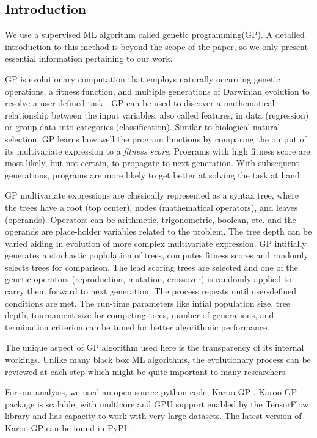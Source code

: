 \subsection{Introduction}
We use a supervised ML algorithm called genetic programming(GP)\cite{koza_genetic}. A detailed introduction to this method is beyond the scope of the paper, so we only present essential information pertaining to our work.

GP is evolutionary computation that employs naturally occurring genetic operations, a fitness function, and multiple generations of
Darwinian evolution to resolve a user-defined task \cite{GP_book}. GP can be used to discover a mathematical relationship between the input variables, also called features, in data (regression) or group data into categories (classification). Similar to biological natural selection, GP learns how well the program functions by comparing the output of its multivariate expression to a \emph{fitness score}. Programs with high fitness score are most likely, but not certain, to propagate to next generation. With subsequent generations, programs are more likely to get better at solving the task at hand \cite{Kai_thesis}. 

GP multivariate expressions are classically represented as a syntax tree, where the trees have a root (top center), nodes (mathematical operators), and leaves (operands). Operators can be arithmetic, trigonometric, boolean, etc. and the operands are place-holder variables related to the problem. The tree depth can be varied aiding in evolution of more complex multivariate expression. GP intitially generates a stochastic poplulation of trees, computes fitness scores and randomly selects trees for comparison. The lead scoring trees are selected and  one of the genetic operators (reproduction, mutation, crossover) is randomly applied to carry them forward to next generation. The process repeats until user-defined  conditions are met. The run-time parameters like intial population size, tree depth, tournament size for competing trees, number of generations, and termination criterion can be tuned for better algorithmic performance. %

The unique aspect of GP algorithm used here is the transparency of its internal workings. Unlike many black box ML algorithms, the evolutionary process can be reviewed at each step which might be quite important to many researchers.\cite{Cavaglia_2020}

For our analysis, we used an open source python code, Karoo GP \cite{KarooGP}. Karoo GP package is scalable, with multicore and GPU support enabled by the TensorFlow library and has capacity to work with very large datasets. The latest version of Karoo GP can be found in PyPI \cite{KarooPYPI}.   

